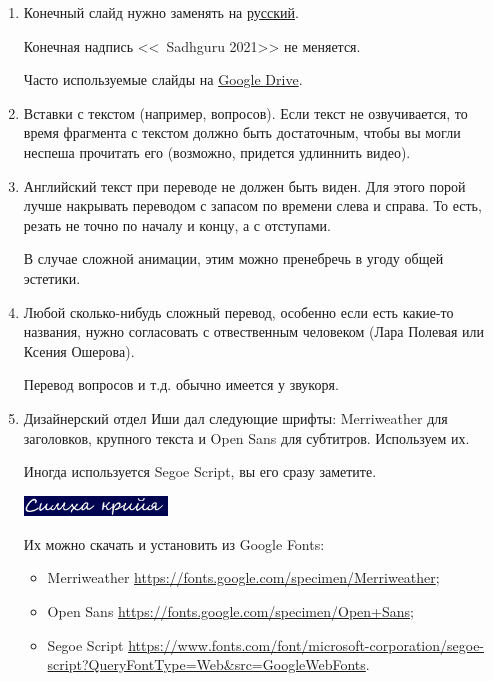 \documentclass[
a4paper, %
12pt, %
article,
onecolumn, %
openany, %
]{memoir}
\begin{document}
\begin{enumerate}
\item Конечный слайд нужно заменять на \href{https://drive.google.com/file/d/11NbSgvq8LbxDcy-a2WY5OJTKUZKcZx88/view?usp=sharing}{русский}. 

	Конечная надпись <<\textcopyright\ Sadhguru 2021>> не меняется.

 Часто используемые слайды на 
\href{https://drive.google.com/drive/folders/1O54z3DtKpl90ut0Aa8wYkEEP37e00zPY?usp=sharing}{Google Drive}.

\item Вставки с текстом (например, вопросов). Если текст не озвучивается, то время фрагмента с текстом должно быть достаточным, чтобы вы могли неспеша прочитать его (возможно, придется удлиннить видео).

\item Английский текст при переводе не должен быть виден. Для этого порой лучше
    накрывать переводом с запасом по времени слева и справа. То есть, резать
    не точно по началу и концу, а с отступами.

    В случае сложной анимации, этим можно пренебречь в угоду общей эстетики.

\item Любой сколько-нибудь сложный перевод, особенно если есть какие-то названия, нужно согласовать с отвественным человеком (Лара Полевая или Ксения Ошерова).

	Перевод вопросов и т.д. обычно имеется у звукоря.

\item Дизайнерский отдел Иши дал следующие шрифты: Merriweather для заголовков, крупного текста и Open Sans для субтитров. Используем их.

    Иногда используется Segoe Script, вы его сразу заметите.

 \includegraphics[width=0.3\textwidth]{segoeScript}

    Их можно скачать и установить из Google Fonts:
    \begin{itemize}
        \item  Merriweather \href{https://fonts.google.com/specimen/Merriweather}{\small https://fonts.google.com/specimen/Merriweather};
        \item Open Sans \href{https://fonts.google.com/specimen/Open+Sans}{\small https://fonts.google.com/specimen/Open+Sans};
    \item Segoe Script \href{https://www.fonts.com/font/microsoft-corporation/segoe-script?QueryFontType=Web&src=GoogleWebFonts}{\small https://www.fonts.com/font/microsoft-corporation/segoe-script?QueryFontType=Web\&src=GoogleWebFonts}.
      \end{itemize}



\end{enumerate}
\end{document}
